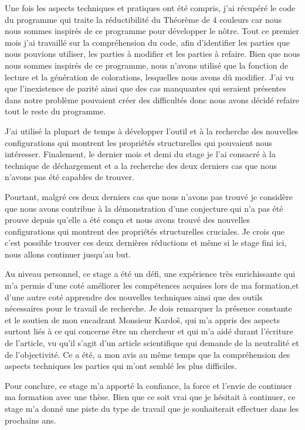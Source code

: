 \documentclass[10pt,a4paper]{article}
\begin{document}
Une fois les aspects techniques et pratiques ont été compris, j'ai récupéré le code du programme qui traite la réductibilité du Théorème de 4 couleurs car nous nous sommes inspirés de ce programme pour développer le nôtre. Tout ce premier mois j'ai travaillé sur la compréhension du code, afin d'identifier les parties que nous pouvions utiliser, les parties à modifier et les parties à refaire. Bien que nous nous sommes inspirés de ce programme, nous n'avons utilisé que la fonction de lecture et la génération de colorations, lesquelles nous avons dû modifier. J'ai vu que l'inexistence de parité ainsi que des cas manquantes qui seraient présentes dans notre problème pouvaient créer des difficultés donc nous avons décidé refaire tout le reste du programme.

J'ai utilisé la plupart de temps à développer l'outil et à la recherche des nouvelles configurations qui montrent les propriétés structurelles qui pouvaient nous intéresser. Finalement, le dernier mois et demi du stage je l'ai consacré à la technique de déchargement et a la recherche des deux derniers cas que nous n'avons pas été capables de trouver.

Pourtant, malgré ces deux derniers cas que nous n'avons pas trouvé je considère que nous avons contribue à la démonstration d'une conjecture qui n'a pas été prouve depuis qu'elle a été conçu et nous avons trouvé des nouvelles configurations qui montrent des propriétés structurelles cruciales. Je crois que c'est possible trouver ces deux dernières réductions et même si le stage fini ici, nous allons continuer jusqu'au but. 

Au niveau personnel, ce stage a été un défi, une expérience très enrichissante qui m'a permis d'une coté améliorer les compétences acquises lors de ma formation,et d'une autre coté apprendre des nouvelles techniques ainsi que des outils nécessaires pour le travail de recherche. Je dois remarquer la présence constante et le soutien de mon encadrant Monsieur Kardo\v s, qui m'a appris des aspects surtout liés à ce qui concerne être un chercheur et qui m'a aidé durant l'écriture de l'article, vu qu'il s'agit d'un article scientifique qui demande de la neutralité et de l'objectivité. Ce a été, a mon avis au même temps que la compréhension des aspects techniques les parties qui m'ont semblé les plus difficiles.

Pour conclure, ce stage m'a apporté la confiance, la force et l'envie de continuer ma formation avec une thèse. Bien que ce soit vrai que je hésitait à continuer, ce stage m'a donné une piste du type de travail que je souhaiterait effectuer dans les prochains ans.
\end{document}
